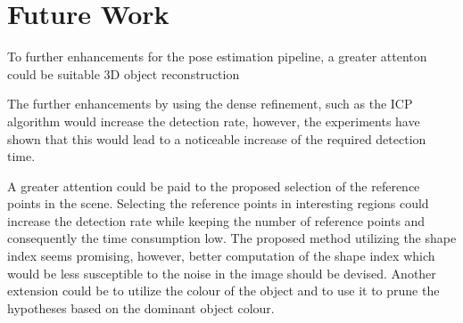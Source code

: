 \chapter{Future Work}
\label{chap:futurework}

To further enhancements for the pose estimation pipeline, a greater attenton could be suitable 3D object reconstruction  


The further enhancements by using the dense refinement, such as the ICP algorithm
would increase the detection rate, however, the experiments have shown that this would lead to a noticeable increase of the required detection time.




A greater attention could be paid to the proposed selection of the reference points in the scene. Selecting the reference points in interesting regions could increase the detection rate while keeping the number of reference points and consequently the time consumption low. The proposed method utilizing the shape index seems promising, however, better computation of the shape index which would be less susceptible to the noise in the image should be devised.
Another extension could be to utilize the colour of the object and to use it to prune the hypotheses based on the dominant object colour.